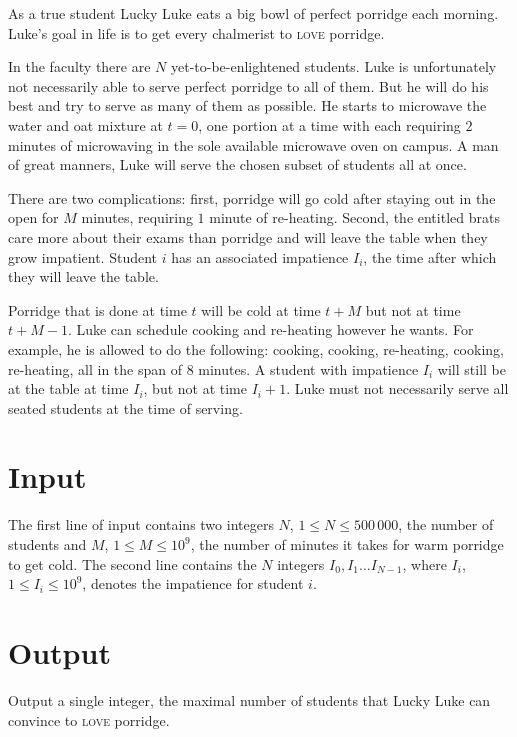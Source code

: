 As a true student Lucky Luke eats a big bowl of perfect porridge each morning. Luke’s goal in life is to get every chalmerist to \textsc{love} porridge.

In the faculty there are $N$ yet-to-be-enlightened students. Luke is unfortunately not necessarily
able to serve perfect porridge to all of them. But he will do his best and try to serve as many of
them as possible. He starts to microwave the water and oat mixture at $t=0$, one portion at a time
with each requiring $2$ minutes of microwaving in the sole available microwave oven on campus. A man
of great manners, Luke will serve the chosen subset of students all at once.

There are two complications: first, porridge will go cold after staying out in the open for $M$ minutes, requiring $1$ minute of re-heating. Second, the entitled brats care more about their exams than porridge and will leave the table when they grow impatient. Student $i$ has an associated impatience $I_i$, the time after which they will leave the table.

Porridge that is done at time $t$ will be cold at time $t+M$ but not at time $t+M-1$. Luke can
schedule cooking and re-heating however he wants. For example, he is allowed to do the following:
cooking, cooking, re-heating, cooking, re-heating, all in the span of $8$ minutes. A student with
impatience $I_i$ will still be at the table at time $I_i$, but not at time $I_i+1$. Luke must not necessarily serve all seated students at the time of serving.



\section*{Input}
The first line of input contains two integers $N$, $1 \leq N \leq 500\,000$, the number of students and $M$, $1 \leq M \leq 10^9$, the number of minutes it takes for warm porridge to get cold. The second line contains the $N$ integers $I_0, I_1 \ldots I_{N-1}$, where $I_i$, $1 \leq I_i \leq 10^9$, denotes the impatience for student $i$.


\section*{Output}
Output a single integer, the maximal number of students that Lucky Luke can convince to \textsc{love} porridge.
